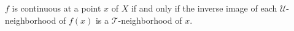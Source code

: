 $f$ is continuous at a point $x$ of $X$ if and only if the inverse image of each $\mathcal{U}$-neighborhood of $f(x)$ is a $\mathcal{T}$-neighborhood of $x$.
